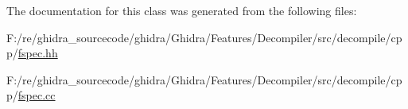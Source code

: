 The documentation for this class was generated from the following files\+:\begin{DoxyCompactItemize}
\item 
F\+:/re/ghidra\+\_\+sourcecode/ghidra/\+Ghidra/\+Features/\+Decompiler/src/decompile/cpp/\mbox{\hyperlink{fspec_8hh}{fspec.\+hh}}\item 
F\+:/re/ghidra\+\_\+sourcecode/ghidra/\+Ghidra/\+Features/\+Decompiler/src/decompile/cpp/\mbox{\hyperlink{fspec_8cc}{fspec.\+cc}}\end{DoxyCompactItemize}
